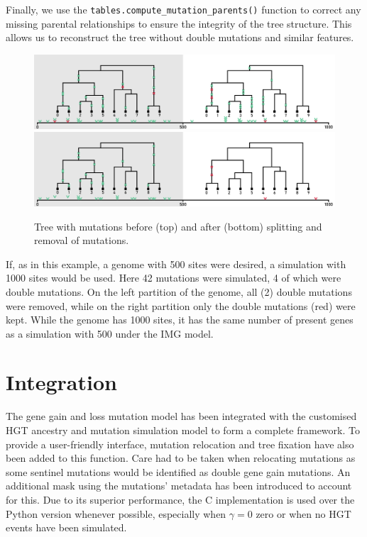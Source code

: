 Finally, we use the \texttt{tables.compute_mutation_parents()} function to correct any missing parental
relationships to ensure the integrity of the tree structure.
This allows us to reconstruct the tree without double mutations and similar features.

\begin{figure}[h]
    \centering
    \includegraphics[width=\textwidth]{figures/tree_split_pre.pdf}\\
    \includegraphics[width=\textwidth]{figures/tree_split_post.pdf}
    \caption[Tree splitting for mutation relocation.]{Tree with mutations before (top) and after (bottom) splitting and removal of mutations.}
    \label{fig:tree-split}
\end{figure}

If, as in this example, a genome with 500 sites were desired, a simulation with 1000 sites would be used.
Here 42 mutations were simulated, 4 of which were double mutations.
On the left partition of the genome, all (2) double mutations were removed, while on the right partition only the double mutations (red) were kept.
While the genome has 1000 sites, it has the same number of present genes as a simulation with 500 under the \ac{IMG} model.

\section{Integration}
The gene gain and loss mutation model has been integrated with the customised \ac{HGT} ancestry and mutation simulation model to form a complete framework.
To provide a user-friendly interface, mutation relocation and tree fixation have also been added to this function.
Care had to be taken when relocating mutations as some sentinel mutations would be identified as double gene gain mutations.
An additional mask using the mutations' metadata has been introduced to account for this.
Due to its superior performance, the C implementation is used over the Python version whenever possible, especially when $\gamma = 0$ zero or when no \ac{HGT} events have been simulated.

